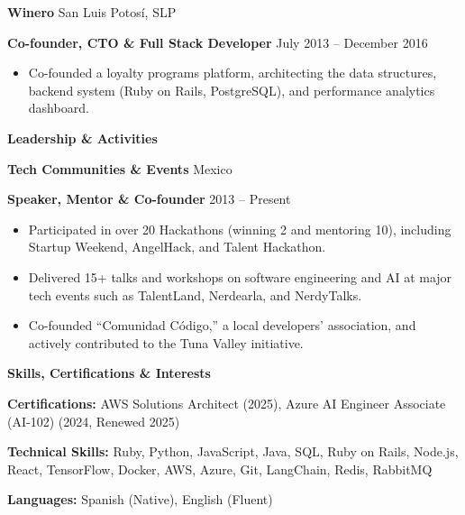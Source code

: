 \documentclass[11pt]{article}
\begin{document}
\vspace{8pt}

\textbf{Winero} \hfill San Luis Potosí, SLP

\textbf{Co-founder, CTO \& Full Stack Developer} \hfill July 2013 – December 2016
\begin{itemize}[noitemsep, topsep=0pt, partopsep=0pt, parsep=0pt]
    \item Co-founded a loyalty programs platform, architecting the data structures, backend system (Ruby on Rails, PostgreSQL), and performance analytics dashboard.
\end{itemize}

\vspace{12pt}

\begin{center}
    \textbf{Leadership \& Activities}
\end{center}

\textbf{Tech Communities \& Events}	\hfill Mexico

\textbf{Speaker, Mentor \& Co-founder} \hfill 2013 – Present
\begin{itemize}[noitemsep, topsep=0pt, partopsep=0pt, parsep=0pt]
    \item Participated in over 20 Hackathons (winning 2 and mentoring 10), including Startup Weekend, AngelHack, and Talent Hackathon.
    \item Delivered 15+ talks and workshops on software engineering and AI at major tech events such as TalentLand, Nerdearla, and NerdyTalks.
    \item Co-founded ``Comunidad Código,'' a local developers' association, and actively contributed to the Tuna Valley initiative.
\end{itemize}

\vspace{12pt}

\begin{center}
    \textbf{Skills, Certifications \& Interests}
\end{center}

\textbf{Certifications:} AWS Solutions Architect (2025), Azure AI Engineer Associate (AI-102) (2024, Renewed 2025)

\textbf{Technical Skills:} Ruby, Python, JavaScript, Java, SQL, Ruby on Rails, Node.js, React, TensorFlow, Docker, AWS, Azure, Git, LangChain, Redis, RabbitMQ

\textbf{Languages:} Spanish (Native), English (Fluent)
\end{document}
